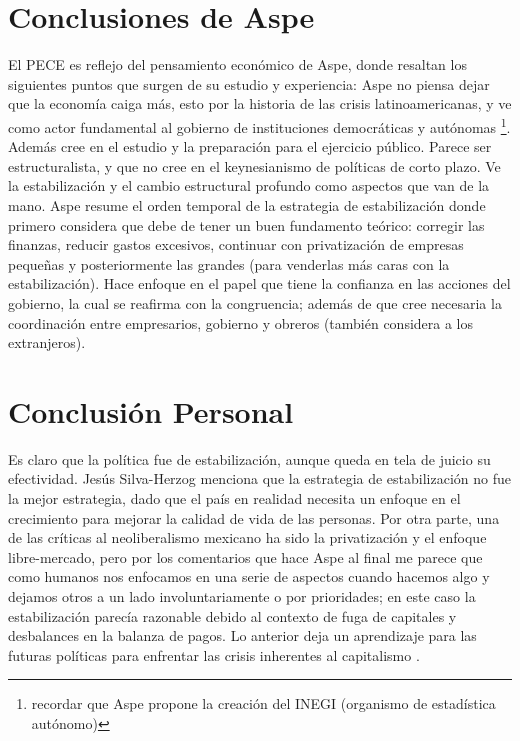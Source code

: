 \section{Conclusiones de Aspe}%
El PECE es reflejo del pensamiento económico de Aspe, donde resaltan los siguientes puntos que surgen de su estudio y experiencia: Aspe no piensa dejar que la economía caiga más, esto por la historia de las crisis latinoamericanas, y ve como actor fundamental al gobierno de instituciones democráticas y autónomas \footnote{recordar que Aspe propone la creación del INEGI (organismo de estadística autónomo)}. Además cree en el estudio y la preparación para el ejercicio público. Parece ser estructuralista, y que no cree en el keynesianismo de políticas de corto plazo. Ve la estabilización y el cambio estructural profundo como aspectos que van de la mano.
Aspe resume el orden temporal de la estrategia de estabilización donde primero considera que debe de tener un buen fundamento teórico: corregir las finanzas, reducir gastos excesivos, continuar con privatización de empresas pequeñas y posteriormente las grandes (para venderlas más caras con la estabilización).
Hace enfoque en el papel que tiene la confianza en las acciones del gobierno, la cual se reafirma con la congruencia; además de que cree necesaria la coordinación entre empresarios, gobierno y obreros (también considera a los extranjeros).

\section{Conclusión Personal}
Es claro que la política fue de estabilización, aunque queda en tela de juicio su efectividad. Jesús Silva-Herzog menciona que la estrategia de estabilización no fue la mejor estrategia, dado que el país en realidad necesita un enfoque en el crecimiento para mejorar la calidad de vida de las personas. Por otra parte, una de las críticas al neoliberalismo mexicano ha sido la privatización y el enfoque libre-mercado, pero por los comentarios que hace Aspe al final me parece que como humanos nos enfocamos en una serie de aspectos cuando hacemos algo y dejamos otros a un lado involuntariamente o por prioridades; en este caso la estabilización parecía razonable debido al contexto de fuga de capitales y desbalances en la balanza de pagos. Lo anterior deja un aprendizaje para las futuras políticas para enfrentar las crisis inherentes al capitalismo \cite{AjusteMacroAspe, Silva-Herzog-Opinion-Desarrollo}.
